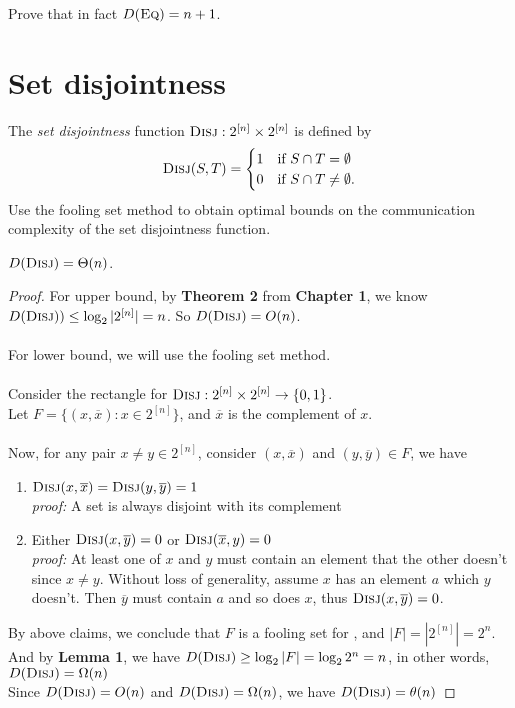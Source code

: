 \exercises

\begin{exercise}
	Prove that in fact $D(\textsc{Eq}) = n+1$.
\end{exercise}


\section{Set disjointness}

The \emph{set disjointness} function $\textsc{Disj} : 2^{[n]} \times 2^{[n]}$ is defined by
\[
\textsc{Disj}(S,T) = \begin{cases}
1 & \mbox{if } S \cap T = \emptyset \\
0 & \mbox{if } S \cap T \neq \emptyset.
\end{cases}
\]
Use the fooling set method to obtain optimal bounds on the communication complexity of the set disjointness function.

\begin{theorem}
	$D(\textsc{Disj}) = \Theta(n)$.
\end{theorem}

\begin{proof}
	For upper bound, by \textbf{Theorem 2} from \textbf{Chapter 1}, we know $D(\textsc{Disj})) \leq \log_2 |2^{[n]}| = n$. So $D(\textsc{Disj}) = O(n)$.\\
	\\
	For lower bound, we will use the fooling set method.\\
	\\
	Consider the rectangle for $\textsc{Disj} :2^{[n]} \times 2^{[n]} \rightarrow \{0,1\}$.\\
	Let $F = \{(x,\overline{x}): x \in 2^{[n]}\}$, and $\overline{x}$ is the complement of $x$. \\
	\\
	Now, for any pair $x \neq y \in 2^{[n]}$, consider $(x,\overline{x})$ and $(y,\overline{y}) \in F$, we have 
	\begin{enumerate}
		\item $\textsc{Disj}(x,\overline{x}) = \textsc{Disj}(y,\overline{y}) = 1$ \\
		\textit{proof:} A set is always disjoint with its complement 
		\item Either $\textsc{Disj}(x,\overline{y}) = 0$ or $\textsc{Disj}(\overline{x},y) = 0$ \\
		\textit{proof:} At least one of $x$ and $y$ must contain an element that the other doesn't since $x \neq y$. Without loss of generality, assume $x$ has an element $a$ which $y$ doesn't. Then $\overline{y}$ must contain $a$ and so does $x$, thus $\textsc{Disj}(x,\overline{y}) = 0$.
	\end{enumerate} 
	By above claims, we conclude that $F$ is a fooling set for \Disj, and $|F| = |2^{[n]}| = 2^n$.\\
	And by \textbf{Lemma 1}, we have $D(\textsc{Disj}) \ge \log_2 |F| = \log_2 2^n = n$, in other words, $D(\textsc{Disj}) = \Omega(n)$\\
	Since $D(\textsc{Disj}) = O(n)$ and $D(\textsc{Disj}) = \Omega(n)$, we have $D(\textsc{Disj}) = \theta(n)$
\end{proof}



